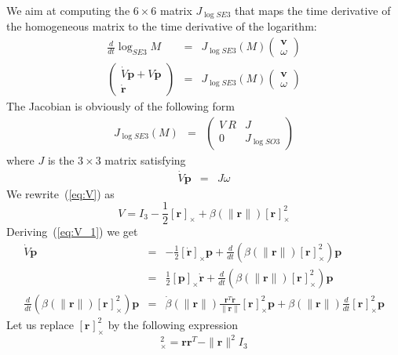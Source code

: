 \documentclass {article}
\newcommand\rot{\mathbf{r}}
\newcommand\rcross[1]{[\rot_{#1}]_{\times}}
\newcommand\normr{\|\rot\|}
\newcommand\JlogSO[1]{J_{\log SO#1}}
\newcommand\logSE[1]{\log_{SE#1}}
\newcommand\JlogSE[1]{J_{\log SE#1}}
\begin{document}
We aim at computing the $6\times 6$ matrix $\JlogSE{3}$ that maps the time derivative of the homogeneous matrix to the time derivative of the logarithm:
\begin{eqnarray*}
\frac{d}{dt} \logSE{3} M &=& \JlogSE{3} (M) \left(\begin{array}{c}\mathbf{v}\\ \omega\end{array}\right)\\
\left(\begin{array}{c}\dot{V}\mathbf{p} + V\mathbf{\dot{p}} \\
\mathbf{\dot{r}}\end{array}\right) &=& \JlogSE{3} (M) \left(\begin{array}{c}\mathbf{v}\\ \omega\end{array}\right)
\end{eqnarray*}
The Jacobian is obviously of the following form
\begin{eqnarray*}
\JlogSE{3} (M) &=&\left(\begin{array}{cc}
V\ R & J \\ 0 & \JlogSO{3}
\end{array}\right)
\end{eqnarray*}
where $J$ is the $3\times 3$ matrix satisfying
\begin{eqnarray*}
\dot{V} \mathbf{p} &=& J\omega
\end{eqnarray*}
We rewrite~(\ref{eq:V}) as
\begin{equation}\label{eq:V_1}
V = I_3 -\frac{1}{2}\rcross{} +  \beta (\normr)\rcross{}^2
\end{equation}
Deriving~(\ref{eq:V_1}) we get
\begin{eqnarray}
\dot{V} \mathbf{p} &=& -\frac{1}{2}[\dot{\rot}]_{\times}\mathbf{p} +  \frac{d}{dt}\left(\beta (\normr)\rcross{}^2 \right)\mathbf{p}\\
\label{eq:1}
 &=& \frac{1}{2}[\mathbf{p}]_{\times}\dot{\rot} + \frac{d}{dt}\left(\beta (\normr)\rcross{}^2 \right)\mathbf{p}\\
\frac{d}{dt}\left(\beta (\normr)\rcross{}^2 \right)\mathbf{p} &=&
\dot{\beta} (\normr) \frac{\rot^T\dot{\rot}}{\normr}\rcross{}^2\mathbf{p} +
\beta (\normr)\frac{d}{dt}\rcross{}^2 \mathbf{p}
\end{eqnarray}
Let us replace $\rcross{}^2$ by the following expression
\begin{equation}
\rcross{}^2=\rot\rot^T - \normr^2 I_3
\end{equation}
\end{document}
